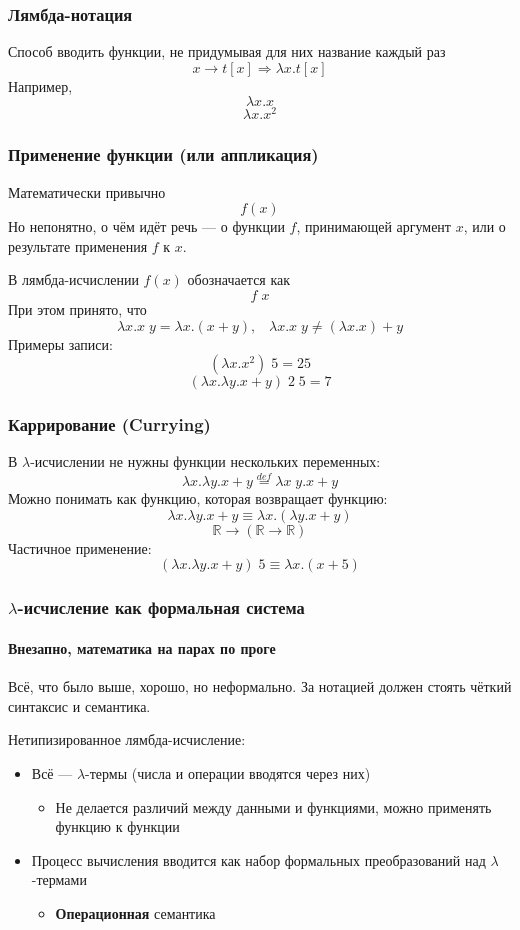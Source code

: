 \documentclass[xetex,mathserif,serif]{beamer}
\begin{document}
	\begin{frame}
		\frametitle{Лямбда-нотация}
		Способ вводить функции, не придумывая для них название каждый раз
		$$x \rightarrow t[x] \Longrightarrow \lambda x.t[x]$$
		Например,
		$$\lambda x.x$$
		$$\lambda x.x^2$$
	\end{frame}

	\begin{frame}
		\frametitle{Применение функции (или аппликация)}
		Математически привычно
		$$f(x)$$
		Но непонятно, о чём идёт речь --- о функции $f$, принимающей аргумент $x$, или о результате применения
		$f$ к $x$. 

		В лямбда-исчислении $f(x)$ обозначается как
		$$f \; x$$
		При этом принято, что
		$$\lambda x. x \; y = \lambda x.(x + y), \;\;\; 
		\lambda x. x \; y \neq (\lambda x.x) + y$$
		Примеры записи:
		$$(\lambda x.x^2) \; 5 = 25$$
		$$(\lambda x.\lambda y.x + y) \; 2 \; 5 = 7$$
	\end{frame}

	\begin{frame}
		\frametitle{Каррирование (Currying)}
		В $\lambda$-исчислении не нужны функции нескольких переменных:
		$$\lambda x.\lambda y.x + y \stackrel{def}{=} \lambda x \; y.x + y$$
		Можно понимать как функцию, которая возвращает функцию:
		$$\lambda x.\lambda y.x + y \equiv \lambda x.(\lambda y.x + y)$$
		$$\mathbb{R} \rightarrow (\mathbb{R} \rightarrow \mathbb{R})$$
		Частичное применение:
		$$(\lambda x.\lambda y.x + y) \; 5 \equiv \lambda x.(x + 5)$$
	\end{frame}
	
	\begin{frame}
		\frametitle{$\lambda$-исчисление как формальная система}
		\framesubtitle{Внезапно, математика на парах по проге}
		Всё, что было выше, хорошо, но неформально. За нотацией должен стоять чёткий 
		синтаксис и	семантика.
		
		Нетипизированное лямбда-исчисление:
		\begin{itemize}
			\item Всё --- $\lambda$-термы (числа и операции вводятся через них)
			\begin{itemize}
				\item Не делается различий между данными и функциями, можно применять 
						функцию к функции
			\end{itemize}
			\item Процесс вычисления вводится как набор формальных преобразований над
					$\lambda$-термами
			\begin{itemize}
				\item \textbf{Операционная} семантика
			\end{itemize}
		\end{itemize}
	\end{frame}
\end{document}
